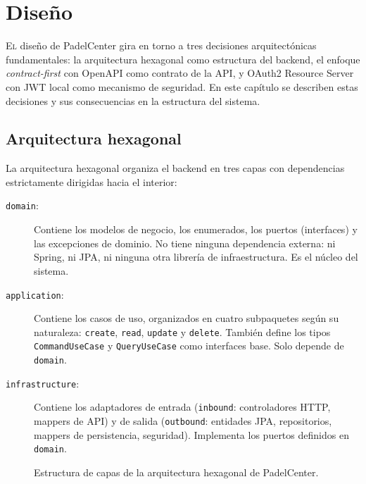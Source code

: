 \chapter{Diseño}
\label{chap:diseno}

\lettrine{E}{l} diseño de PadelCenter gira en torno a tres decisiones
arquitectónicas fundamentales: la arquitectura hexagonal como estructura del
backend, el enfoque \textit{contract-first} con OpenAPI como contrato de la API,
y OAuth2 Resource Server con JWT local como mecanismo de seguridad. En este
capítulo se describen estas decisiones y sus consecuencias en la estructura del
sistema.

\section{Arquitectura hexagonal}
\label{sec:arquitectura_hexagonal}

La arquitectura hexagonal organiza el backend en tres capas con dependencias
estrictamente dirigidas hacia el interior:

\begin{description}
  \item[\texttt{domain}:] Contiene los modelos de negocio, los enumerados, los
    puertos (interfaces) y las excepciones de dominio. No tiene ninguna dependencia
    externa: ni Spring, ni JPA, ni ninguna otra librería de infraestructura. Es el
    núcleo del sistema.

  \item[\texttt{application}:] Contiene los casos de uso, organizados en cuatro
    subpaquetes según su naturaleza: \texttt{create}, \texttt{read},
    \texttt{update} y \texttt{delete}. También define los tipos
    \texttt{CommandUseCase} y \texttt{QueryUseCase} como interfaces base. Solo
    depende de \texttt{domain}.

  \item[\texttt{infrastructure}:] Contiene los adaptadores de entrada
    (\texttt{inbound}: controladores HTTP, mappers de API) y de salida
    (\texttt{outbound}: entidades JPA, repositorios, mappers de persistencia,
    seguridad). Implementa los puertos definidos en \texttt{domain}.
\end{description}

\begin{figure}[ht]
\centering
{}
\caption{Estructura de capas de la arquitectura hexagonal de PadelCenter.}
\label{fig:arquitectura_hexagonal}
\end{figure}

